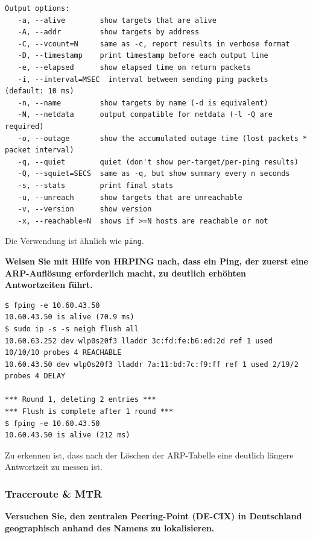 \begin{verbatim}
Output options:
   -a, --alive        show targets that are alive
   -A, --addr         show targets by address
   -C, --vcount=N     same as -c, report results in verbose format
   -D, --timestamp    print timestamp before each output line
   -e, --elapsed      show elapsed time on return packets
   -i, --interval=MSEC  interval between sending ping packets (default: 10 ms)
   -n, --name         show targets by name (-d is equivalent)
   -N, --netdata      output compatible for netdata (-l -Q are required)
   -o, --outage       show the accumulated outage time (lost packets * packet interval)
   -q, --quiet        quiet (don't show per-target/per-ping results)
   -Q, --squiet=SECS  same as -q, but show summary every n seconds
   -s, --stats        print final stats
   -u, --unreach      show targets that are unreachable
   -v, --version      show version
   -x, --reachable=N  shows if >=N hosts are reachable or not
\end{verbatim}

Die Verwendung ist ähnlich wie \texttt{ping}.

\textbf{Weisen Sie mit Hilfe von HRPING nach, dass ein Ping, der zuerst
eine ARP-Auflösung erforderlich macht, zu deutlich erhöhten
Antwortzeiten führt.}

\begin{verbatim}
$ fping -e 10.60.43.50
10.60.43.50 is alive (70.9 ms)
$ sudo ip -s -s neigh flush all
10.60.63.252 dev wlp0s20f3 lladdr 3c:fd:fe:b6:ed:2d ref 1 used 10/10/10 probes 4 REACHABLE
10.60.43.50 dev wlp0s20f3 lladdr 7a:11:bd:7c:f9:ff ref 1 used 2/19/2 probes 4 DELAY

*** Round 1, deleting 2 entries ***
*** Flush is complete after 1 round ***
$ fping -e 10.60.43.50
10.60.43.50 is alive (212 ms)
\end{verbatim}

Zu erkennen ist, dass nach der Löschen der ARP-Tabelle eine deutlich
längere Antwortzeit zu messen ist.

\hypertarget{traceroute-mtr}{%
\subsubsection{Traceroute \& MTR}\label{traceroute-mtr}}

\textbf{Versuchen Sie, den zentralen Peering-Point (DE-CIX) in
Deutschland geographisch anhand des Namens zu lokalisieren.}


